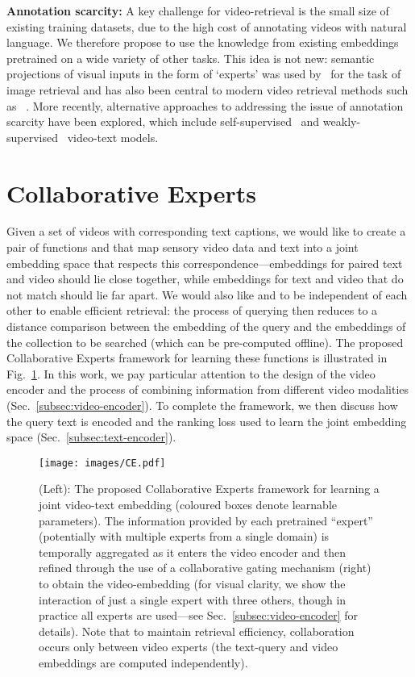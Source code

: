 \documentclass{bmvc2k}
\begin{document}
\noindent\textbf{Annotation scarcity:} A key challenge for video-retrieval is the small size of existing training datasets, due to the high cost of annotating videos with natural language. We therefore propose to use the knowledge from existing embeddings pretrained on a wide variety of other tasks. This idea is not new: semantic projections of visual inputs in the form of `experts' was used by~\cite{douze2011combining} for the task of image retrieval and has also been central to modern video retrieval methods such as ~\citep{miech2018learning,mithun2018learning}.
More recently, alternative approaches to addressing the issue of annotation scarcity have been explored, which include self-supervised~\cite{sun2019videobert} and weakly-supervised~\cite{zhukov2019cross} video-text models.  \section{Collaborative Experts} \label{sec:collab-experts}

Given a set of videos with corresponding text captions, we would like to create a pair of functions  and   
that map sensory video data and text into a joint embedding space that respects this correspondence---embeddings for paired text and video should lie close together, while embeddings for text and video that do not match should lie far apart.  
We would also like  and  to be independent of each other to enable efficient retrieval: the process of querying then reduces to a distance comparison between the embedding of the query and the embeddings of the collection to be searched (which can be pre-computed offline). The proposed Collaborative Experts framework for learning these functions is illustrated in Fig.~\ref{fig:CE-framework}.  In this work, we pay particular attention to the design of the video encoder  and the process of combining information from different video modalities (Sec.~\ref{subsec:video-encoder}). To complete the framework, we then discuss how the query text is encoded and the ranking loss used to learn the joint embedding space (Sec.~\ref{subsec:text-encoder}).
  

\begin{figure}[!t]
\begin{center}
\texttt{[image: images/CE.pdf]}
\end{center}
  \caption{(Left): The proposed Collaborative Experts framework for learning a joint video-text embedding (coloured boxes denote learnable parameters). The information provided by each pretrained ``expert'' (potentially with multiple experts from a single domain) is temporally aggregated as it enters the video encoder and then refined through the use of a collaborative gating mechanism (right) to obtain the video-embedding (for visual clarity, we show the interaction of just a single expert with three others, though in practice all experts are used---see Sec.~\ref{subsec:video-encoder} for details). Note that to maintain retrieval efficiency, collaboration occurs only between video experts (the text-query and video embeddings are computed independently).\label{fig:CE-framework}}
\end{figure}
\end{document}
